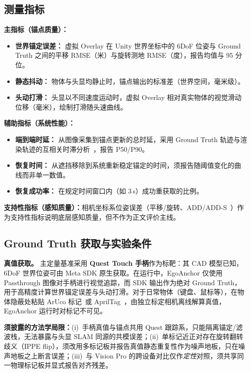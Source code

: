 \documentclass[review]{vgtc}
\begin{document}
\subsection{测量指标}

\noindent\textbf{主指标（锚点质量）：}
\begin{itemize}[leftmargin=1.4em]
  \item \textbf{世界锚定误差：} 虚拟 Overlay 在 Unity 世界坐标中的 6DoF 位姿与 Ground Truth 之间的平移 RMSE（米）与旋转测地 RMSE（度），报告均值与 95 分位。
  \item \textbf{静态抖动：} 物体与头显均静止时，锚点输出的标准差（世界空间，毫米级）。
  \item \textbf{头动打滑：} 头显以不同速度运动时，虚拟 Overlay 相对真实物体的视觉滑动位移（毫米），绘制打滑随头速曲线。
\end{itemize}

\noindent\textbf{辅助指标（系统性能）：}
\begin{itemize}[leftmargin=1.4em]
  \item \textbf{端到端时延：} 从图像采集到锚点更新的总时延，采用 Ground Truth 轨迹与渲染轨迹的互相关时滞分析~\cite{diluca2010latency}，报告 P50/P90。
  \item \textbf{恢复时间：} 从遮挡移除到系统重新稳定锚定的时间，须报告随阈值变化的曲线而非单一数值。
  \item \textbf{恢复成功率：} 在规定时间窗口内（如 3\,s）成功重获取的比例。
\end{itemize}

\noindent\textbf{支持性指标（感知质量）：}相机坐标系位姿误差（平移/旋转、ADD/ADD-S~\cite{hinterstoisser2012add,posecnn2017}）作为支持性指标说明底层感知质量，但不作为正文评价主线。

\subsection{Ground Truth 获取与实验条件}

\noindent\textbf{真值获取。} 主定量基准采用 \textbf{Quest Touch 手柄}作为标靶：其 CAD 模型已知，6DoF 世界位姿可由 Meta SDK 原生获取。在运行中，EgoAnchor 仅使用 Passthrough 图像对手柄进行视觉追踪，而 SDK 输出作为绝对 Ground Truth，用于高精度计算世界锚定误差与头动打滑。对于日常物体（键盘、鼠标等），在物体隐蔽处粘贴 ArUco 标记~\cite{garridojurado2014aruco}或 AprilTag~\cite{olson2011apriltag}，由独立标定相机离线解算真值，EgoAnchor 运行时对标记不可见。

\noindent\textbf{须披露的方法学局限：}(i)~手柄真值与锚点共用 Quest 跟踪系，只能隔离锚定/滤波栈，无法暴露与头显 SLAM 同源的共模误差；(ii)~单标记近正对存在旋转翻转歧义（IPPE flip），须改用多标记板并报告真值静态重复性作为噪声地板，只在噪声地板之上断言误差；(iii)~与 Vision Pro 的跨设备对比仅作\emph{定性}对照，须共享同一物理标记板并显式报告对齐残差。
\end{document}
